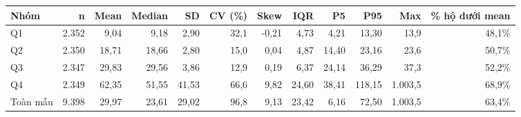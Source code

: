 \begin{tabular}{lrrrrrrrrrrr}
\toprule
Nhóm & n & Mean & Median & SD & CV (\%) & Skew & IQR & P5 & P95 & Max & \% hộ dưới mean \\
\midrule
Q1 & 2.352 & 9,04 & 9,18 & 2,90 & 32,1 & -0,21 & 4,73 & 4,21 & 13,30 & 13,9 & 48,1\% \\
Q2 & 2.350 & 18,71 & 18,66 & 2,80 & 15,0 & 0,04 & 4,87 & 14,40 & 23,16 & 23,6 & 50,7\% \\
Q3 & 2.347 & 29,83 & 29,56 & 3,86 & 12,9 & 0,19 & 6,37 & 24,14 & 36,29 & 37,3 & 52,2\% \\
Q4 & 2.349 & 62,35 & 51,55 & 41,53 & 66,6 & 9,82 & 24,60 & 38,41 & 118,15 & 1.003,5 & 68,9\% \\
Toàn mẫu & 9.398 & 29,97 & 23,61 & 29,02 & 96,8 & 9,13 & 23,42 & 6,16 & 72,50 & 1.003,5 & 63,4\% \\
\bottomrule
\end{tabular}
